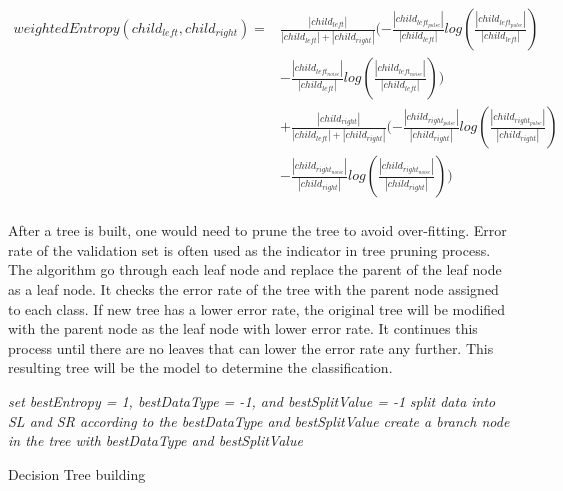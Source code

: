 \documentclass[twoside]{article}
\begin{document}
\begin{align*}
weightedEntropy(child_{left}, child_{right}) =& \frac{|child_{left}|}{|child_{left}| + |child_{right}|}(- \frac{|child_{left_{pulse}}|}{|child_{left}|}log(\frac{|child_{left_{pulse}}|}{|child_{left}|}) \\
&- \frac{|child_{left_{noise}}|}{|child_{left}|}log(\frac{|child_{left_{noise}}|}{|child_{left}|}))\\
&+\frac{|child_{right}|}{|child_{left}| + |child_{right}|}(- \frac{|child_{right_{pulse}}|}{|child_{right}|}log(\frac{|child_{right_{pulse}}|}{|child_{right}|}) \\
&- \frac{|child_{right_{noise}}|}{|child_{right}|}log(\frac{|child_{right_{noise}}|}{|child_{right}|}))\\
\end{align*}

After a tree is built, one would need to prune the tree to avoid over-fitting. Error rate of the validation set is often used as the indicator in tree pruning process. The algorithm go through each leaf node and replace the parent of the leaf node as a leaf node. It checks the error rate of the tree with the parent node assigned to each class. If new tree has a lower error rate, the original tree will be modified with the parent node as the leaf node with lower error rate. It continues this process until there are no leaves that can lower the error rate any further. This resulting tree will be the model to determine the classification. 

\IncMargin{1em}
\begin{algorithm}
\BlankLine
{}
\emph{set bestEntropy = 1, bestDataType = -1, and bestSplitValue = -1}\;
\emph{split data into SL and SR according to the bestDataType and bestSplitValue}\;
\emph{create a branch node in the tree with bestDataType and bestSplitValue}\;
\caption{Decision Tree building}\label{DCb}
\end{algorithm}\DecMargin{1em}
\end{document}
